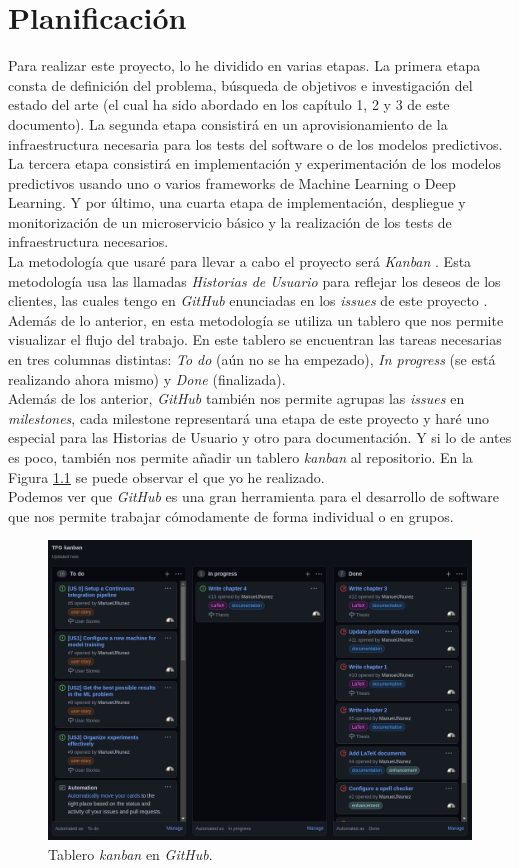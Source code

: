 \chapter{Planificación}

Para realizar este proyecto, lo he dividido en varias etapas. La primera etapa consta de definición del problema, búsqueda de objetivos e investigación del estado del arte (el cual ha sido abordado en los capítulo 1, 2 y 3 de este documento). La segunda etapa consistirá en un aprovisionamiento de la infraestructura necesaria para los tests del software o de los modelos predictivos. La tercera etapa consistirá en implementación y experimentación de los modelos predictivos usando uno o varios frameworks de Machine Learning o Deep Learning. Y por último, una cuarta etapa de implementación, despliegue y monitorización de un microservicio básico y la realización de los tests de infraestructura necesarios.\\

La metodología que usaré para llevar a cabo el proyecto será \textit{Kanban} \cite{kanban}. Esta metodología usa las llamadas \textit{Historias de Usuario} para reflejar los deseos de los clientes, las cuales tengo en \textit{GitHub} enunciadas en los \textit{issues} de este proyecto \cite{issues}. Además de lo anterior, en esta metodología se utiliza un tablero que nos permite visualizar el flujo del trabajo. En este tablero se encuentran las tareas necesarias en tres columnas distintas: \textit{To do} (aún no se ha empezado), \textit{In progress} (se está realizando ahora mismo) y \textit{Done} (finalizada).\\

Además de los anterior, \textit{GitHub} también nos permite agrupas las \textit{issues} en \textit{milestones}, cada milestone representará una etapa de este proyecto y haré uno especial para las Historias de Usuario y otro para documentación. Y si lo de antes es poco, también nos permite añadir un tablero \textit{kanban} al repositorio. En la Figura \ref{fig:kanban} se puede observar el que yo he realizado.\\

Podemos ver que \textit{GitHub} es una gran herramienta para el desarrollo de software que nos permite trabajar cómodamente de forma individual o en grupos.

\begin{figure}[H]
	\includegraphics[scale=0.3]{imagenes/04_Planificacion/kanban.png}
	\centering
	\caption{Tablero \textit{kanban} en \textit{GitHub}. \cite{mykanban}}
	\label{fig:kanban}
\end{figure}

